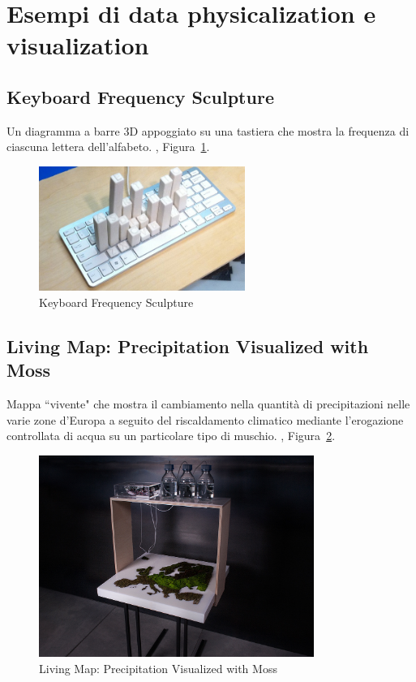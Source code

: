 \documentclass[12pt,a4paper]{report}
\begin{document}
\section{Esempi di data physicalization e visualization}

\subsection{Keyboard Frequency Sculpture}
Un diagramma a barre 3D appoggiato su una tastiera che mostra la frequenza di ciascuna lettera dell'alfabeto.
\cite{physlist}, Figura~\ref{fig:keyboardfreq}.
\begin{figure}[h]
  \centering
  \includegraphics[width=0.6\textwidth]{keyboardfreq}
  \caption{Keyboard Frequency Sculpture}
  \label{fig:keyboardfreq}
\end{figure}

\subsection{Living Map: Precipitation Visualized with Moss}
Mappa ``vivente" che mostra il cambiamento nella quantità di precipitazioni nelle varie zone d'Europa a seguito del riscaldamento climatico
mediante l'erogazione controllata di acqua su un particolare tipo di muschio.  \cite{physlist}, Figura~\ref{fig:livingmap}.
\begin{figure}[h]
  \centering
  \includegraphics[width=0.8\textwidth]{livingmap}
  \caption{Living Map: Precipitation Visualized with Moss}
  \label{fig:livingmap}
\end{figure}
\end{document}
